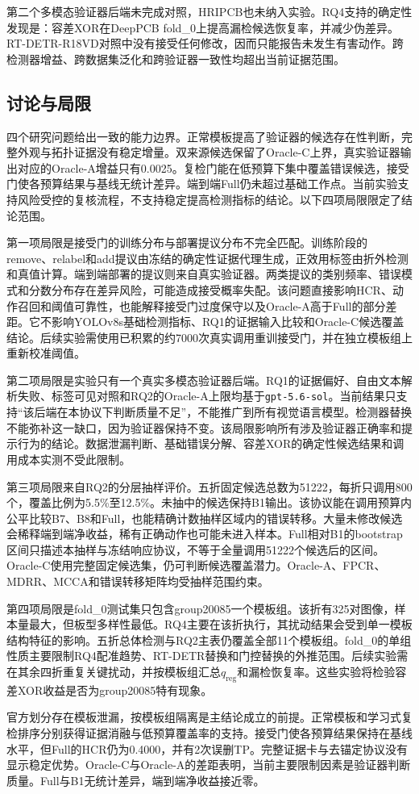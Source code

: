 第二个多模态验证器后端未完成对照，HRIPCB也未纳入实验。RQ4支持的确定性发现是：容差XOR在DeepPCB fold\_0上提高漏检候选恢复率，并减少伪差异。RT-DETR-R18VD对照中没有接受任何修改，因而只能报告未发生有害动作。跨检测器增益、跨数据集泛化和跨验证器一致性均超出当前证据范围。

\subsection{讨论与局限}
\label{subsec:discussion_limitations}

四个研究问题给出一致的能力边界。正常模板提高了验证器的候选存在性判断，完整外观与拓扑证据没有稳定增量。双来源候选保留了Oracle-C上界，真实验证器输出对应的Oracle-A增益只有0.0025。复检门能在低预算下集中覆盖错误候选，接受门使各预算结果与基线无统计差异。端到端Full仍未超过基础工作点。当前实验支持风险受控的复核流程，不支持稳定提高检测指标的结论。以下四项局限限定了结论范围。

第一项局限是接受门的训练分布与部署提议分布不完全匹配。训练阶段的remove、relabel和add提议由冻结的确定性证据代理生成，正效用标签由折外检测和真值计算。端到端部署的提议则来自真实验证器。两类提议的类别频率、错误模式和分数分布存在差异风险，可能造成接受概率失配。该问题直接影响HCR、动作召回和阈值可靠性，也能解释接受门过度保守以及Oracle-A高于Full的部分差距。它不影响YOLOv8s基础检测指标、RQ1的证据输入比较和Oracle-C候选覆盖结论。后续实验需使用已积累的约7000次真实调用重训接受门，并在独立模板组上重新校准阈值。

第二项局限是实验只有一个真实多模态验证器后端。RQ1的证据偏好、自由文本解析失败、标签可见对照和RQ2的Oracle-A上限均基于\texttt{gpt-5.6-sol}。当前结果只支持“该后端在本协议下判断质量不足”，不能推广到所有视觉语言模型。检测器替换不能弥补这一缺口，因为验证器保持不变。该局限影响所有涉及验证器正确率和提示行为的结论。数据泄漏判断、基础错误分解、容差XOR的确定性候选结果和调用成本实测不受此限制。

第三项局限来自RQ2的分层抽样评价。五折固定候选总数为51222，每折只调用800个，覆盖比例为5.5\%至12.5\%。未抽中的候选保持B1输出。该协议能在调用预算内公平比较B7、B8和Full，也能精确计数抽样区域内的错误转移。大量未修改候选会稀释端到端净收益，稀有正确动作也可能未进入样本。Full相对B1的bootstrap区间只描述本抽样与冻结响应协议，不等于全量调用51222个候选后的区间。Oracle-C使用完整固定候选集，仍可判断候选覆盖潜力。Oracle-A、FPCR、MDRR、MCCA和错误转移矩阵均受抽样范围约束。

第四项局限是fold\_0测试集只包含group20085一个模板组。该折有325对图像，样本量最大，但板型多样性最低。RQ4主要在该折执行，其扰动结果会受到单一模板结构特征的影响。五折总体检测与RQ2主表仍覆盖全部11个模板组。fold\_0的单组性质主要限制RQ4配准趋势、RT-DETR替换和门控替换的外推范围。后续实验需在其余四折重复关键扰动，并按模板组汇总$q_{\mathrm{reg}}$和漏检恢复率。这些实验将检验容差XOR收益是否为group20085特有现象。

官方划分存在模板泄漏，按模板组隔离是主结论成立的前提。正常模板和学习式复检排序分别获得证据消融与低预算覆盖率的支持。接受门使各预算结果保持在基线水平，但Full的HCR仍为0.4000，并有2次误删TP。完整证据卡与去锚定协议没有显示稳定优势。Oracle-C与Oracle-A的差距表明，当前主要限制因素是验证器判断质量。Full与B1无统计差异，端到端净收益接近零。
